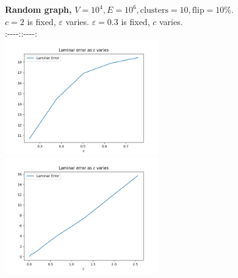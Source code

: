 \documentclass[
]{article}
\begin{document}
\textbf{Random graph,}
{\(V = 10^{4},E = 10^{6},\text{clusters} = 10,\text{flip} = 10\%\)}.\\
{\(c = 2\)} is fixed, {\(\varepsilon\)} varies. \textbar{}
{\(\varepsilon = 0.3\)} is fixed, {\(c\)} varies.\\
:-\/-\/-\/-:\textbar:-\/-\/-\/-:\\
\includegraphics[width=0.5\textwidth]{images/laminar_error_as_epsilon_varies.png}
\textbar{}
\includegraphics[width=0.5\textwidth]{images/laminar_error_as_c_varies.png}
\end{document}
